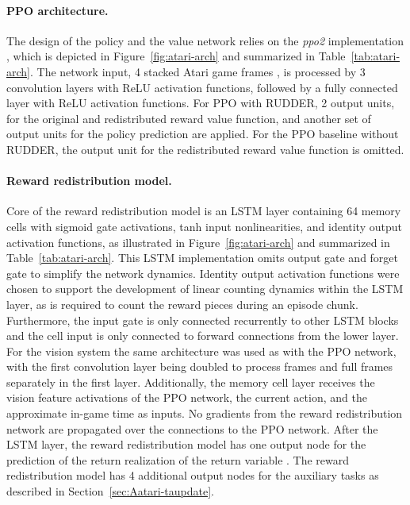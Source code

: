 \documentclass{article}
\begin{document}
\begin{appendices}
\paragraph{PPO architecture.}
The design of the policy and the value network relies 
on the {\em ppo2} implementation \cite{Dhariwal:17}, which  
is depicted in Figure~\ref{fig:atari-arch} and 
summarized in Table~\ref{tab:atari-arch}.
The network input, 4 stacked Atari game frames \cite{Mnih:15},
is processed by 3 convolution layers with ReLU activation functions,
followed by a fully connected layer with ReLU activation functions.
For PPO with RUDDER,
2 output units, for the original and redistributed reward value function,
and another set of output units for the policy prediction are applied.
For the PPO baseline without RUDDER,
the output unit for the redistributed reward value function is omitted.


\paragraph{Reward redistribution model.}
Core of the reward redistribution model
is an LSTM layer containing 64 memory cells
with sigmoid gate activations, tanh input nonlinearities, 
and identity output activation functions, 
as illustrated in Figure~\ref{fig:atari-arch} 
and summarized in Table~\ref{tab:atari-arch}.
This LSTM implementation omits output gate and forget gate to simplify the network dynamics.
Identity output activation functions were chosen to support 
the development of linear counting dynamics within the LSTM layer, 
as is required to count the reward pieces during an episode chunk.
Furthermore, the input gate is only connected recurrently to other LSTM blocks and the
cell input is only connected to forward connections from the lower layer.
For the vision system the same architecture was used as with the PPO network,
with the first convolution layer being doubled to process
 frames and full frames separately in the first layer.
Additionally, the memory cell layer receives the vision feature activations
of the PPO network, the current action, and the approximate in-game time as inputs.
No gradients from the reward redistribution network are propagated over the connections to the PPO network.
After the LSTM layer, the reward redistribution model
has one output node for the prediction 
of the return realization  of the return variable .
The reward redistribution model has 4 additional
output nodes for the auxiliary tasks as described in Section~\ref{sec:Aatari-taupdate}.


\end{appendices}
\end{document}
